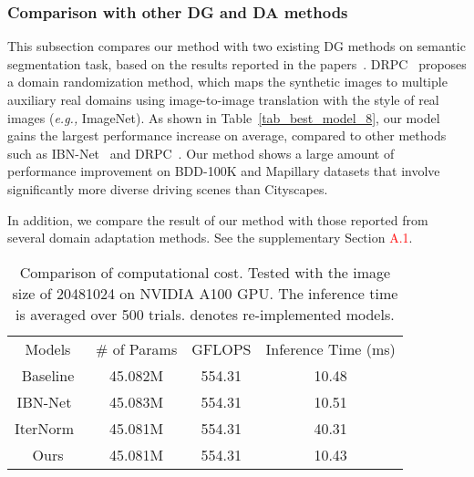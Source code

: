 \documentclass[final]{latex/cvpr}
\newcommand{\drule}{\specialrule{0.2pt}{1pt}{1pt}\specialrule{0.2pt}{0pt}{\belowrulesep}}
\newcommand{\todow}[1]{\textcolor{red}{#1}}
\begin{document}
\vspace{-0.35cm}
\subsubsection{Comparison with other DG and DA methods}
\vspace{-0.2cm}
This subsection compares our method with two existing DG methods on semantic segmentation task, based on the results reported in the papers~\cite{pan2018two,yue2019domain}. DRPC~\cite{yue2019domain} proposes a domain randomization method, which maps the synthetic images to multiple auxiliary real domains using image-to-image translation with the style of real images (\textit{e.g.,} ImageNet). As shown in Table~\ref{tab_best_model_8}, our model gains the largest performance increase on average, compared to other methods such as IBN-Net~\cite{pan2018two} and DRPC~\cite{yue2019domain}. Our method shows a large amount of performance improvement on BDD-100K and Mapillary datasets that involve significantly more diverse driving scenes than Cityscapes.

In addition, we compare the result of our method with those reported from several domain adaptation methods. See the supplementary Section \todow{A.1}.















\begin{table}[t!]
\vspace*{-0.0cm}
\begin{center}
\setlength\tabcolsep{4.2pt}
\footnotesize
\begin{tabular}{c|c|c|c}
\toprule
Models & \# of Params & GFLOPS & Inference Time (ms) \\
\drule
Baseline  & 45.082M & 554.31 &  10.48\\ 
\midrule
IBN-Net~\cite{pan2018two}      & 45.083M & 554.31 &  10.51\\
\midrule
IterNorm~\cite{huang2019iterative} & 45.081M & 554.31 &  40.31\\ 
\midrule
Ours    & 45.081M & 554.31 &  10.43 \\
\bottomrule
\end{tabular}
\end{center}
\vspace*{-0.2cm}
\caption{Comparison of computational cost. Tested with the image size of 20481024 on NVIDIA A100 GPU. The inference time is averaged over 500 trials.  denotes re-implemented models.}
\label{tab_computational_cost}
\vspace*{-0.5cm}
\end{table}
\end{document}
